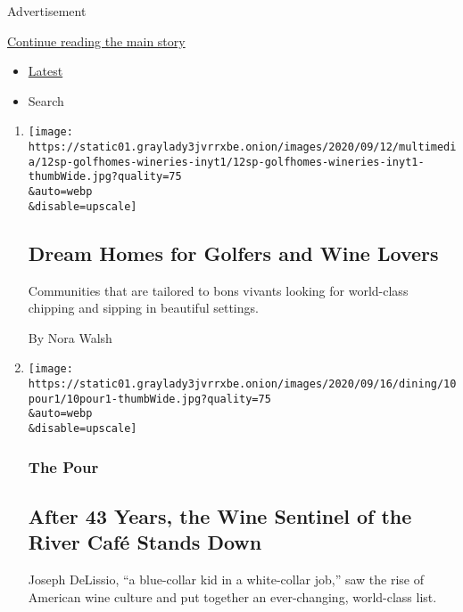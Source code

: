 Advertisement

\protect\hyperlink{after-mid1}{Continue reading the main story}

\begin{itemize}
\tightlist
\item
  \protect\hyperlink{stream-panel}{Latest}
\item
  Search
\end{itemize}

\begin{enumerate}
\def\labelenumi{\arabic{enumi}.}
\item
  \href{/2020/09/11/realestate/golf-homes-community-wineries.html}{}

  \texttt{[image: https://static01.graylady3jvrrxbe.onion/images/2020/09/12/multimedia/12sp-golfhomes-wineries-inyt1/12sp-golfhomes-wineries-inyt1-thumbWide.jpg?quality=75\\\&auto=webp\\\&disable=upscale]}

  \hypertarget{dream-homes-for-golfers-and-wine-lovers}{%
  \subsection{Dream Homes for Golfers and Wine
  Lovers}\label{dream-homes-for-golfers-and-wine-lovers}}

  Communities that are tailored to bons vivants looking for world-class
  chipping and sipping in beautiful settings.

  By Nora Walsh
\item
  \href{/2020/09/10/dining/drinks/river-cafe-wine-joseph-delissio.html}{}

  \texttt{[image: https://static01.graylady3jvrrxbe.onion/images/2020/09/16/dining/10pour1/10pour1-thumbWide.jpg?quality=75\\\&auto=webp\\\&disable=upscale]}

  \hypertarget{the-pour-3}{%
  \subsubsection{The Pour}\label{the-pour-3}}

  \hypertarget{after-43-years-the-wine-sentinel-of-the-river-cafuxe9-stands-down}{%
  \subsection{After 43 Years, the Wine Sentinel of the River Café Stands
  Down}\label{after-43-years-the-wine-sentinel-of-the-river-cafuxe9-stands-down}}

  Joseph DeLissio, ``a blue-collar kid in a white-collar job,'' saw the
  rise of American wine culture and put together an ever-changing,
  world-class list.


\end{enumerate}
